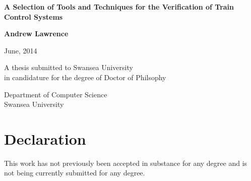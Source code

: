 \documentclass[11pt, a4paper, twoside, openright]{book}
\begin{document}
${ \ } $ \vspace{4cm}
%
%


\begin{center}
{\huge \bf A Selection of Tools and Techniques for the Verification of Train Control Systems }
\end{center}

\begin{center}
{\large \bf Andrew Lawrence}
\end{center}

\begin{center}
June, 2014
\end{center}

\vspace{2.5cm}



\vfill

\begin{center}
A thesis submitted to Swansea University\\
in candidature for the degree of Doctor of Philsophy
\end{center}

\begin{center}
\end{center}

\begin{center}
Department of Computer Science\\
Swansea University
\end{center}

\thispagestyle{empty}

\newpage
\thispagestyle{empty}

\mbox{}

\clearpage



\thispagestyle{empty}

\section*{Declaration}

This work has not previously been accepted in substance for any degree
and is not being currently submitted for any degree.
\end{document}
